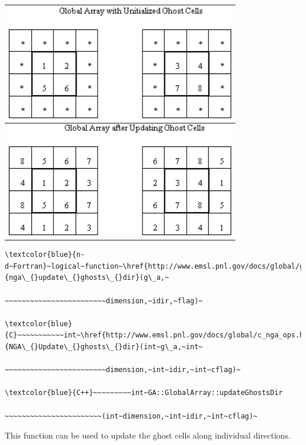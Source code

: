 \begin{tabular}{|c|}
\hline 
\includegraphics[width=10cm]{ghost012}\tabularnewline
\hline
\hline 
\includegraphics[width=10cm]{ghost015}\tabularnewline
\hline
\end{tabular}
\begin{verbatim}
\textcolor{blue}{n-d~Fortran}~logical~function~\href{http://www.emsl.pnl.gov/docs/global/ga_ops.html\#ga_update_ghost_dir}{nga\_{}update\_{}ghosts\_{}dir}(g\_a,~

~~~~~~~~~~~~~~~~~~~~~~~~dimension,~idir,~flag)~

\textcolor{blue}{C}~~~~~~~~~~~int~\href{http://www.emsl.pnl.gov/docs/global/c_nga_ops.html\#nga_update_ghost_dir}{NGA\_{}Update\_{}ghosts\_{}dir}(int~g\_a,~int~

~~~~~~~~~~~~~~~~~~~~~~~~dimension,~int~idir,~int~cflag)~

\textcolor{blue}{C++}~~~~~~~~~int~GA::GlobalArray::updateGhostsDir

~~~~~~~~~~~~~~~~~~~~~~~(int~dimension,~int~idir,~int~cflag)~
\end{verbatim}
This function can be used to update the ghost cells along individual
directions.

